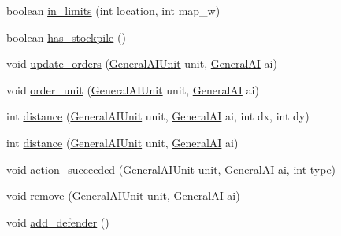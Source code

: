 \begin{DoxyCompactItemize}
\item 
boolean \hyperlink{classai_1_1general_1_1_general_a_i_town_a7e84939ea1dd2924bd4d7d4c72e3f21f}{in\_\-limits} (int location, int map\_\-w)
\item 
boolean \hyperlink{classai_1_1general_1_1_general_a_i_town_a8e6decaf61b5456174e6f8caeaa36109}{has\_\-stockpile} ()
\item 
void \hyperlink{classai_1_1general_1_1_general_a_i_town_a390550d776f507012f3c4def087daddf}{update\_\-orders} (\hyperlink{classai_1_1general_1_1_general_a_i_unit}{GeneralAIUnit} unit, \hyperlink{classai_1_1general_1_1_general_a_i}{GeneralAI} ai)
\item 
void \hyperlink{classai_1_1general_1_1_general_a_i_town_a73a19cdf93f393fcaf97b1cab016f0d9}{order\_\-unit} (\hyperlink{classai_1_1general_1_1_general_a_i_unit}{GeneralAIUnit} unit, \hyperlink{classai_1_1general_1_1_general_a_i}{GeneralAI} ai)
\item 
int \hyperlink{classai_1_1general_1_1_general_a_i_town_a248a180a3546e3644fb329ac9ec32855}{distance} (\hyperlink{classai_1_1general_1_1_general_a_i_unit}{GeneralAIUnit} unit, \hyperlink{classai_1_1general_1_1_general_a_i}{GeneralAI} ai, int dx, int dy)
\item 
int \hyperlink{classai_1_1general_1_1_general_a_i_town_a08398ead5c3de183c9722463aa13faa3}{distance} (\hyperlink{classai_1_1general_1_1_general_a_i_unit}{GeneralAIUnit} unit, \hyperlink{classai_1_1general_1_1_general_a_i}{GeneralAI} ai)
\item 
void \hyperlink{classai_1_1general_1_1_general_a_i_town_a74842a9ebfb725c2a82c3cfa2302165b}{action\_\-succeeded} (\hyperlink{classai_1_1general_1_1_general_a_i_unit}{GeneralAIUnit} unit, \hyperlink{classai_1_1general_1_1_general_a_i}{GeneralAI} ai, int type)
\item 
void \hyperlink{classai_1_1general_1_1_general_a_i_town_ad886c779c1766b6817067b54232770d6}{remove} (\hyperlink{classai_1_1general_1_1_general_a_i_unit}{GeneralAIUnit} unit, \hyperlink{classai_1_1general_1_1_general_a_i}{GeneralAI} ai)
\item 
void \hyperlink{classai_1_1general_1_1_general_a_i_town_a35b5ee2f71343d25c4e77bb8e3c46886}{add\_\-defender} ()
\end{DoxyCompactItemize}

